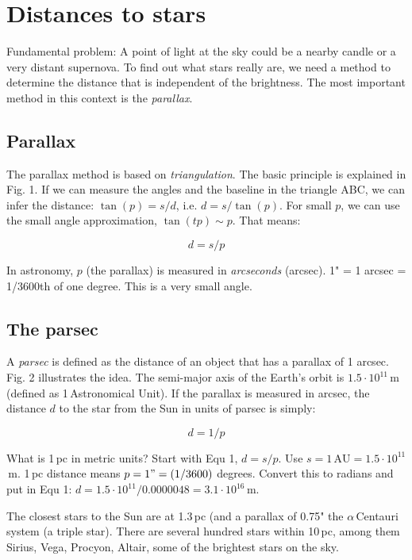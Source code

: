\section{Distances to stars}

Fundamental problem: A point of light at the sky could be a nearby candle or a very distant supernova. To find out what stars really are, we need a method to determine the distance that is independent of the brightness. The most important method in this context is the \textit{parallax}.

\subsection{Parallax}

The parallax method is based on \textit{triangulation}. The basic principle is explained in Fig. 1. If we can measure the angles and the baseline in the triangle ABC, we can infer the distance: $\tan{(p)} = s/d$, i.e. $d = s/\tan{(p)}$. For small $p$, we can use the small angle approximation, $\tan{(tp)} \sim p$. That means:

\begin{equation}
d = s/p
\end{equation}

In astronomy, $p$ (the parallax) is measured in \textit{arcseconds} (arcsec). 1" = 1 arcsec = 1/3600th of one degree. This is a very small angle.

\subsection{The parsec}

A \textit{parsec} is defined as the distance of an object that has a parallax of 1 arcsec. Fig. 2 illustrates the idea. The semi-major axis of the Earth's orbit is $1.5 \cdot 10^{11}$\,m (defined as 1\,Astronomical Unit). If the parallax is measured in arcsec, the distance $d$ to the star from the Sun in units of parsec is simply:

\begin{equation}
d = 1/p
\end{equation}

What is 1\,pc in metric units? Start with Equ 1, $d = s/p$. Use $s = 1\,\mathrm{AU} = 1.5 \cdot 10^{11}$\,m. 1\,pc distance means $p = 1" = (1/3600)$ degrees. Convert this to radians and put in Equ 1: $d = 1.5 \cdot 10^{11} / 0.0000048 = 3.1 \cdot 10^{16}$\,m. 

The closest stars to the Sun are at 1.3\,pc (and a parallax of 0.75" the $\alpha$\,Centauri system (a triple star). There are several hundred stars within 10\,pc, among them Sirius, Vega, Procyon, Altair, some of the brightest stars on the sky.

